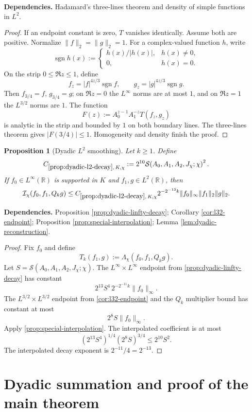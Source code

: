 \documentclass[11pt]{article}
\newtheorem{proposition}[proposition]{Proposition}
\theoremstyle{definition}
\theoremstyle{remark}
\newcommand{\R}{\mathbb R}
\newcommand{\1}{\mathbf 1}
\newcommand{\Ichi}{\mathcal I_{\chi}}
\newcommand{\Lamchi}{\Lambda_{\chi}}
\newcommand{\lpNorm}[2]{\lVert #1\rVert_{#2}}
\newcommand{\uses}[1]{\par\smallskip\noindent\textbf{Dependencies.} #1\par\smallskip}
\newcommand{\Ssize}[2]{\mathcal S\!\left(#1;#2\right)}
\begin{document}
\uses{Hadamard's three-lines theorem and density of simple functions in $L^2$.}

\begin{proof}
If an endpoint constant is zero, $T$ vanishes identically.  Assume both are positive.  Normalize $\lpNorm f2=\lpNorm g2=1$.  For a complex-valued function $h$, write
\[
\operatorname{sgn}h(x):=
\begin{cases}
h(x)/|h(x)|,&h(x)\neq0,\\
0,&h(x)=0.
\end{cases}
\]
On the strip $0\leq\Re z\leq1$, define
\[
f_z=|f|^{4z/3}\operatorname{sgn}f,
\qquad
g_z=|g|^{4z/3}\operatorname{sgn}g.
\]  Then $f_{3/4}=f$, $g_{3/4}=g$; on $\Re z=0$ the $L^\infty$ norms are at most $1$, and on $\Re z=1$ the $L^{3/2}$ norms are $1$.  The function
\[
F(z):=A_0^{z-1}A_1^{-z}T(f_z,g_z)
\]
is analytic in the strip and bounded by $1$ on both boundary lines.  The three-lines theorem gives $|F(3/4)|\leq1$.  Homogeneity and density finish the proof.
\end{proof}

\begin{proposition}[Dyadic $L^2$ smoothing]\label{prop:dyadic-l2-decay}
Let $k\geq1$.  Define
\[
C_{\ref{prop:dyadic-l2-decay},\,K,\chi}
:=
2^{10}\Ssize{A_0,A_1,A_2,J_\chi}{\chi}^{2}.
\]
If $f_0\in L^\infty(\R)$ is supported in $K$ and $f_1,g\in L^2(\R)$, then
\[
\Ichi(f_0,f_1,Q_kg)
\leq
C_{\ref{prop:dyadic-l2-decay},\,K,\chi}
2^{-2^{-13}k}
\lpNorm{f_0}\infty\lpNorm{f_1}2\lpNorm g2.
\]
\end{proposition}

\uses{Proposition \ref{prop:dyadic-linfty-decay}; Corollary \ref{cor:l32-endpoint}; Proposition \ref{prop:special-interpolation}; Lemma \ref{lem:dyadic-reconstruction}.}

\begin{proof}
Fix $f_0$ and define
\[
T_k(f_1,g):=\Lamchi(f_0,f_1,Q_kg).
\]
Let $S=\Ssize{A_0,A_1,A_2,J_\chi}{\chi}$.  The $L^\infty\times L^\infty$ endpoint from \cref{prop:dyadic-linfty-decay} has constant
\[
2^{13}S^4\,2^{-2^{-11}k}\lpNorm{f_0}\infty.
\]
The $L^{3/2}\times L^{3/2}$ endpoint from \cref{cor:l32-endpoint} and the $Q_k$ multiplier bound has constant at most
\[
2^8S\lpNorm{f_0}\infty.
\]
Apply \cref{prop:special-interpolation}.  The interpolated coefficient is at most
\[
(2^{13}S^4)^{1/4}(2^8S)^{3/4}
\leq2^{10}S^2.
\]
The interpolated decay exponent is
$2^{-11}/4=2^{-13}$.
\end{proof}

\section{Dyadic summation and proof of the main theorem}\label{sec:main-proof}
\end{document}
